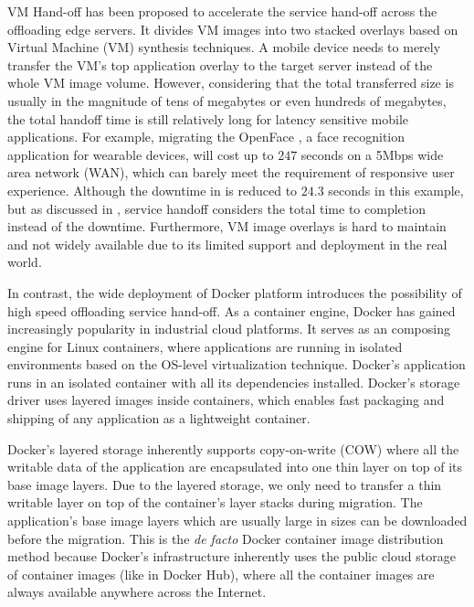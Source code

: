 VM Hand-off \cite{ha2015vmhandoff} has been proposed to accelerate the service hand-off across the offloading edge servers. It divides VM images into two stacked overlays based on Virtual Machine (VM) synthesis \cite{satya2009case} techniques. %
A mobile device needs to merely transfer the VM's top application overlay to the target server instead of the whole VM image volume. However, considering that the total transferred size is usually in the magnitude of tens of megabytes or even hundreds of megabytes, the total handoff time is still relatively long for latency sensitive mobile applications. For example, migrating the OpenFace \cite{openface2016}, a face recognition application for wearable devices, will cost up to $247$ seconds on a 5Mbps wide area network (WAN), which can barely meet the requirement of responsive user experience. Although the downtime in \cite{ha2015vmhandoff} is reduced to $24.3$ seconds in this example, but as discussed in \cite{ha2015vmhandoff}, service handoff considers the total time to completion instead of the downtime. 
Furthermore, VM image overlays is hard to maintain and not widely available due to its limited support and deployment in the real world.

In contrast, the wide deployment of Docker platform introduces the possibility of high speed offloading service hand-off. As a container engine, Docker has gained increasingly popularity in industrial cloud platforms. It serves as an composing engine for Linux containers, where applications are running in isolated environments based on the OS-level virtualization technique.
Docker's application runs in an isolated container with all its dependencies installed. Docker's storage driver uses layered images inside containers, which enables fast packaging and shipping of any application as a lightweight container. 

Docker's layered storage inherently supports copy-on-write (COW) where all the writable data of the application are encapsulated into one thin layer on top of its base image layers.
Due to the layered storage, we only need to transfer a thin writable layer on top of the container's layer stacks during migration. The application's base image layers which are usually large in sizes can be downloaded before the migration. 
This is the \textit{de facto} Docker container image distribution method because Docker's infrastructure inherently uses the public cloud storage of container images (like in Docker Hub\cite{dockerhub}), where all the container images are always available anywhere across the Internet. 

